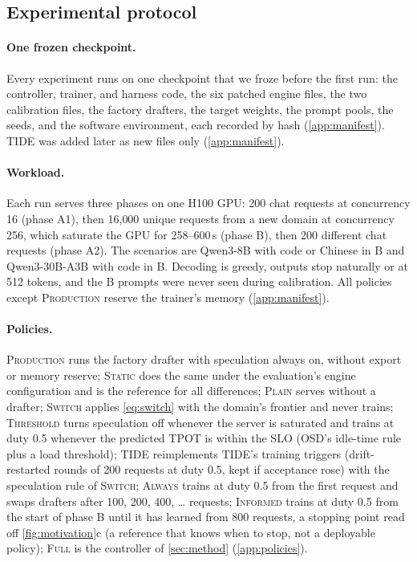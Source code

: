 \documentclass{article}
\newcommand{\pol}[1]{\textsc{#1}}
\begin{document}
\subsection{Experimental protocol}\label{sec:setup}

\paragraph{One frozen checkpoint.} Every experiment runs on one checkpoint that we froze before the first run: the controller, trainer, and harness code, the six patched engine files, the two calibration files, the factory drafters, the target weights, the prompt pools, the seeds, and the software environment, each recorded by hash (\cref{app:manifest}). \pol{TIDE} was added later as new files only (\cref{app:manifest}).

\paragraph{Workload.} Each run serves three phases on one H100 GPU: 200 chat requests at concurrency 16 (phase A1), then 16{,}000 unique requests from a new domain at concurrency 256, which saturate the GPU for 258--600\,s (phase B), then 200 different chat requests (phase A2). The scenarios are Qwen3-8B with code or Chinese in B and Qwen3-30B-A3B with code in B. Decoding is greedy, outputs stop naturally or at 512 tokens, and the B prompts were never seen during calibration. All policies except \pol{Production} reserve the trainer's memory (\cref{app:manifest}).

\paragraph{Policies.} \pol{Production} runs the factory drafter with speculation always on, without export or memory reserve; \pol{Static} does the same under the evaluation's engine configuration and is the reference for all differences; \pol{Plain} serves without a drafter; \pol{Switch} applies \cref{eq:switch} with the domain's frontier and never trains; \pol{Threshold} turns speculation off whenever the server is saturated and trains at duty 0.5 whenever the predicted TPOT is within the SLO (OSD's idle-time rule \citep{liu2024osd} plus a load threshold); \pol{TIDE} reimplements TIDE's training triggers \citep{park2026tide} (drift-restarted rounds of 200 requests at duty 0.5, kept if acceptance rose) with the speculation rule of \pol{Switch}; \pol{Always} trains at duty 0.5 from the first request and swaps drafters after 100, 200, 400, \dots{} requests; \pol{Informed} trains at duty 0.5 from the start of phase B until it has learned from 800 requests, a stopping point read off \cref{fig:motivation}c (a reference that knows when to stop, not a deployable policy); \pol{Full} is the controller of \cref{sec:method} (\cref{app:policies}).
\end{document}
